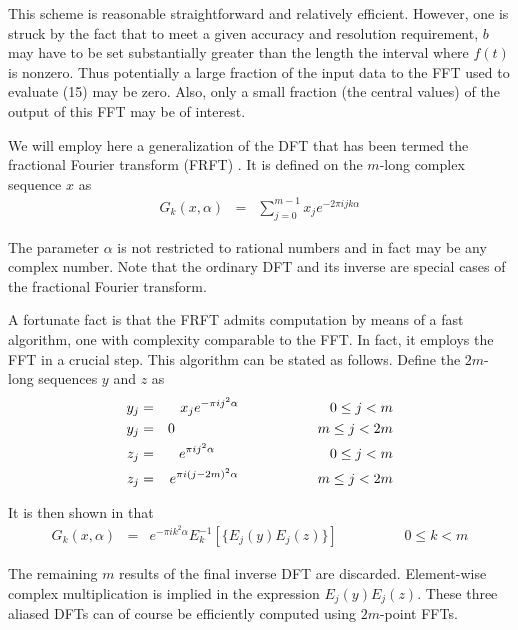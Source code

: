 This scheme is reasonable straightforward and relatively efficient.
However, one is struck by the fact that to meet a given accuracy and
resolution requirement, $b$ may have to be set substantially greater
than the length the interval where $f(t)$ is nonzero.  Thus
potentially a large fraction of the input data to the FFT used to
evaluate (15) may be zero.  Also, only a small fraction (the central
values) of the output of this FFT may be of interest.

\vspace{2ex}

We will employ here a generalization of the DFT that has been termed
the fractional Fourier transform (FRFT) \cite{frft}.  It is defined on
the $m$-long complex sequence $x$ as
\begin{eqnarray}
G_k (x, \alpha) &=& \sum_{j=0}^{m-1} x_j e^{-2 \pi i j k \alpha}
\end{eqnarray}

\noindent
The parameter $\alpha$ is not restricted to rational numbers and in
fact may be any complex number.  Note that the ordinary DFT and its
inverse are special cases of the fractional Fourier transform.

A fortunate fact is that the FRFT admits computation by means of a
fast algorithm, one with complexity comparable to the FFT.  In fact, it
employs the FFT in a crucial step.  This algorithm can be stated as
follows.  Define the $2 m$-long sequences $y$ and $z$ as
\begin{eqnarray}
y_j &=& x_j e^{-\pi i j^2 \alpha} \hspace{23mm} 0 \leq j < m \\
y_j &=& 0 \hspace{36mm} m \leq j < 2 m \\
z_j &=& e^{\pi i j^2 \alpha} \hspace{29mm} 0 \leq j < m \\
z_j &=& e^{\pi i (j - 2 m)^2 \alpha} \hspace{20mm} m \leq j < 2 m
\end{eqnarray}

\noindent
It is then shown in \cite{frft} that
\begin{eqnarray}
G_k (x, \alpha) &=& e^{- \pi i k^2 \alpha} E_k^{-1} [\{ E_j (y) 
     E_j (z) \}] 
   \hspace{2cm} 0 \leq k < m
\end{eqnarray}

\noindent
The remaining $m$ results of the final inverse DFT are discarded.
Element-wise complex multiplication is implied in the expression $E_j
(y) E_j (z)$.  These three aliased DFTs can of course be efficiently
computed using $2 m$-point FFTs.

